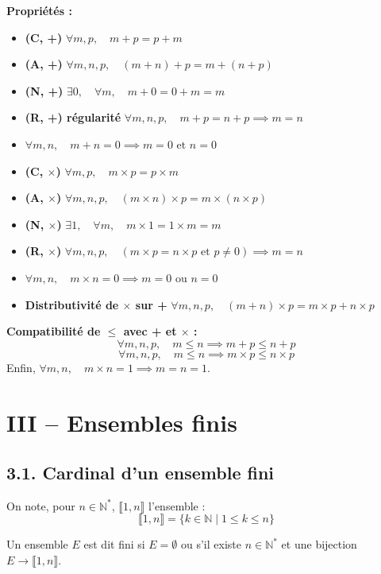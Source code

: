 \documentclass[a4paper,11pt]{article}
\newcommand{\N}{\mathbb{N}}
\begin{document}
\textbf{Propriétés :}
\begin{itemize}
    \item \textbf{(C, +)} $\forall m, p, \quad m+p = p+m$
    \item \textbf{(A, +)} $\forall m, n, p, \quad (m+n)+p = m+(n+p)$
    \item \textbf{(N, +)} $\exists 0, \quad \forall m, \quad m+0 = 0+m = m$
    \item \textbf{(R, +) régularité} $\forall m, n, p, \quad m+p = n+p \implies m=n$
    \item $\forall m, n, \quad m+n = 0 \implies m=0 \text{ et } n=0$
    \item \textbf{(C, $\times$)} $\forall m, p, \quad m \times p = p \times m$
    \item \textbf{(A, $\times$)} $\forall m, n, p, \quad (m \times n) \times p = m \times (n \times p)$
    \item \textbf{(N, $\times$)} $\exists 1, \quad \forall m, \quad m \times 1 = 1 \times m = m$
    \item \textbf{(R, $\times$)} $\forall m, n, p, \quad (m \times p = n \times p \text{ et } p \neq 0) \implies m=n$
    \item $\forall m, n, \quad m \times n = 0 \implies m=0 \text{ ou } n=0$
    \item \textbf{Distributivité de $\times$ sur +} $\forall m, n, p, \quad (m+n) \times p = m \times p + n \times p$
\end{itemize}

\textbf{Compatibilité de $\le$ avec + et $\times$ :}
\[
\forall m, n, p, \quad m \le n \implies m+p \le n+p
\]
\[
\forall m, n, p, \quad m \le n \implies m \times p \le n \times p
\]
Enfin, $\forall m, n, \quad m \times n = 1 \implies m = n = 1$.

\section{III -- Ensembles finis}

\subsection{3.1. Cardinal d'un ensemble fini}

On note, pour $n \in \N^*$, $\llbracket 1, n \rrbracket$ l'ensemble :
\[
\llbracket 1, n \rrbracket = \{ k \in \N \mid 1 \le k \le n \}
\]

\begin{definition}
Un ensemble $E$ est dit fini si $E = \emptyset$ ou s'il existe $n \in \N^*$ et une bijection $E \to \llbracket 1, n \rrbracket$.
\end{definition}
\end{document}
